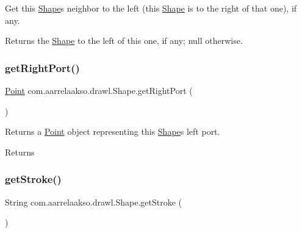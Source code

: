 Get this \hyperlink{classcom_1_1aarrelaakso_1_1drawl_1_1_shape}{Shape}\textquotesingle{}s neighbor to the left (this \hyperlink{classcom_1_1aarrelaakso_1_1drawl_1_1_shape}{Shape} is to the right of that one), if any. 

\begin{DoxyReturn}{Returns}
the \hyperlink{classcom_1_1aarrelaakso_1_1drawl_1_1_shape}{Shape} to the left of this one, if any; {\ttfamily null} otherwise. 
\end{DoxyReturn}
\mbox{\label{classcom_1_1aarrelaakso_1_1drawl_1_1_shape_a319c78d425ec91e1aef1072a95e349ad}} 
\subsubsection{\texorpdfstring{get\+Right\+Port()}{getRightPort()}}
{\footnotesize\ttfamily \hyperlink{classcom_1_1aarrelaakso_1_1drawl_1_1_point}{Point} com.\+aarrelaakso.\+drawl.\+Shape.\+get\+Right\+Port (\begin{DoxyParamCaption}{ }\end{DoxyParamCaption})}



Returns a \hyperlink{classcom_1_1aarrelaakso_1_1drawl_1_1_point}{Point} object representing this \hyperlink{classcom_1_1aarrelaakso_1_1drawl_1_1_shape}{Shape}\textquotesingle{}s left port. 

\begin{DoxyReturn}{Returns}

\end{DoxyReturn}
\mbox{\label{classcom_1_1aarrelaakso_1_1drawl_1_1_shape_a4e1d54c7e161e3af5053939ddefdf9e6}} 
\subsubsection{\texorpdfstring{get\+Stroke()}{getStroke()}}
{\footnotesize\ttfamily String com.\+aarrelaakso.\+drawl.\+Shape.\+get\+Stroke (\begin{DoxyParamCaption}{ }\end{DoxyParamCaption})}



